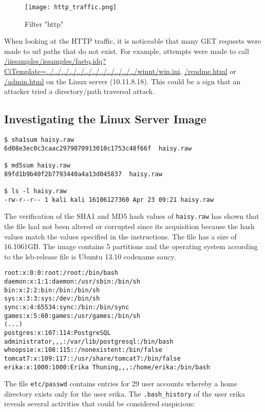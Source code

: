 \begin{figure}[h]
\texttt{[image: http\_traffic.png]}
\centering
\caption{Filter "http"}
\label{screen:http_traffic}
\end{figure}

\noindent When looking at the HTTP traffic, it is noticeable that many GET requests were made to url paths that do not exist. For example, attempts were made to call \url{/iissamples/issamples/fastq.idq?CiTemplate=../../../../../../../../../../../../winnt/win.ini}, \url{/readme.html} or \url{/admin.html} on the Linux server (10.11.8.18). This could be a sign that an attacker tried a directory/path traversal attack.

\subsection{Investigating the Linux Server Image}
\begin{verbatim}
$ sha1sum haisy.raw      
6d08e3ec0c3caac2979070913010c1753c48f66f  haisy.raw

$ md5sum haisy.raw      
89fd1b9b40f2b7793440a4a13d045837  haisy.raw

$ ls -l haisy.raw     
-rw-r--r-- 1 kali kali 16106127360 Apr 23 09:21 haisy.raw
\end{verbatim}
The verification of the SHA1 and MD5 hash values of \texttt{haisy.raw} has shown that the file had not been altered or corrupted since its acquisition because the hash values match the values specified in the instructions. The file has a size of 16.1061GB. The image contains 5 partitions and the operating system according to the lsb-release file is Ubuntu 13.10 codename saucy.
\begin{verbatim}
​​root:x:0:0:root:/root:/bin/bash
daemon:x:1:1:daemon:/usr/sbin:/bin/sh
bin:x:2:2:bin:/bin:/bin/sh
sys:x:3:3:sys:/dev:/bin/sh
sync:x:4:65534:sync:/bin:/bin/sync
games:x:5:60:games:/usr/games:/bin/sh
(...)
postgres:x:107:114:PostgreSQL administrator,,,:/var/lib/postgresql:/bin/bash
whoopsie:x:108:115::/nonexistent:/bin/false
tomcat7:x:109:117::/usr/share/tomcat7:/bin/false
erika:x:1000:1000:Erika Thuning,,,:/home/erika:/bin/bash
\end{verbatim}
\noindent The file \texttt{etc/passwd} contains entries for 29 user accounts whereby a home directory exists only for the user erika. The \texttt{.bash\_history} of the user erika reveals several activities that could be considered suspicious:
